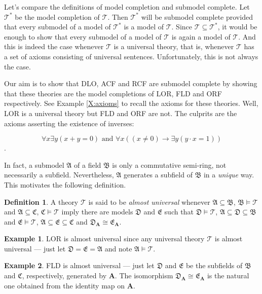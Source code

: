 \documentclass[titlepage, oneside]{amsbook}
\theoremstyle{plain}
\theoremstyle{definition}
\newtheorem{examples}{Example}
\newtheorem{definition}{Definition}
\theoremstyle{remark}
\newcommand{\theory}{\ensuremath{\mathcal{T}}}
\newcommand{\tee}{\ensuremath{\mathcal{T}}}
\newcommand{\tst}{\ensuremath{\mathcal{T}^{\ast}}}
\newcommand{\tstar}{\ensuremath{\mathcal{T}^{\ast}}}
\newcommand{\seq}{\ensuremath{\subseteq}}
\newcommand{\ma}{\ensuremath{\mathfrak{A}}}
\newcommand{\mb}{\ensuremath{\mathfrak{B}}}
\newcommand{\mc}{\ensuremath{\mathfrak{C}}}
\newcommand{\md}{\ensuremath{\mathfrak{D}}}
\newcommand{\me}{\ensuremath{\mathfrak{E}}}
\newcommand{\ba}{\ensuremath{\mathbf{A}}}
\begin{document}
Let's compare the definitions of model completion and submodel
complete. Let $\tst$ be the model completion of $\tee$.  Then $\tst$ will be
submodel complete provided that every submodel of a model of $\tst$ is a model
of $\tee$. Since $\theory \seq \tstar$, it would be enough to show
that every submodel of a model of $\tee$ is again a model of $\tee$.
And this is indeed the case whenever $\tee$ is a universal theory, that
is, whenever $\tee$ has a set of axioms consisting of universal
sentences. Unfortunately, this is not always the case.

%
%
%
Our aim is to show that DLO, ACF and RCF are submodel complete by showing 
that these theories are the model completions of LOR, FLD and ORF respectively. See Example \ref{X:axioms} to recall the axioms for these theories. 
Well, LOR is a universal theory but FLD and ORF are not.
The culprits are the axioms asserting the existence of inverses: 

\[ \forall x \exists y ( x+ y = 0 ) \mbox{ and } 
\forall x (( x \neq 0) \rightarrow \exists y(y \cdot x = 1)) \].

In fact, a submodel $\ma$ of a field $\mb$ is only a commutative semi-ring,
not necessarily a subfield.  Nevertheless, $\ma$ generates a subfield of $\mb$
in a \emph{unique} way.  This motivates the following definition.

\begin{definition}
%
%
  A theory $\tee$ is said to be \emph{almost
universal}
whenever $\ma \seq \mb$, $\mb \models \theory$ and $\ma \seq \mc $, $\mc
\models \theory$ imply there are models $\md$ and $\me$ such that $\md
\models \theory$, $\ma \seq \md \seq \mb$ and $\me \models \theory$, $\ma
\seq \me \seq \mc$ and $\md_\ba \cong \me_\ba$.
\end{definition}

\begin{examples}
%
 LOR is almost universal since any universal theory
$\tee$
is almost universal --- just let $\md = \me = \ma$ and note $\ma
\models
\theory$.
\end{examples}

\begin{examples}
%
 FLD is almost universal --- just let $\md$ and $\me$ be the
subfields of $\mb$ and $\mc$, respectively, generated by $\ba$.  The
isomorphism $\md_\ba \cong \me_\ba$ is the natural one obtained from the
identity map on $\ba$.
\end{examples}
\end{document}
